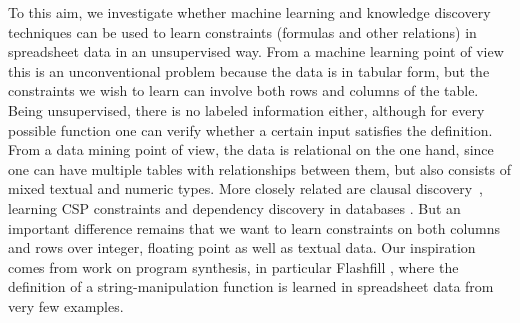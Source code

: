 To this aim,  we investigate whether machine learning and knowledge discovery techniques can be used to learn constraints (formulas and other relations) in spreadsheet data in an unsupervised way.
From a machine learning point of view this is an unconventional problem because the data is in tabular form, but the constraints we wish to learn can involve both rows and columns of the table. Being unsupervised, there is no labeled information either, although for every possible function one can verify whether a certain input satisfies the definition.
From a data mining point of view, the data is relational on the one hand, since one can have multiple tables with relationships between them, but also consists of mixed textual and numeric types. More closely related are clausal discovery~\parencite{claudien,lallouet}, learning CSP constraints \parencite{QUACQ,Conacq,modelseeker} and dependency discovery in databases \parencite{savnik}. But an important difference remains that we want to learn constraints on both columns and rows over integer, floating point as well as textual data.
Our inspiration comes from work on program synthesis, in particular Flashfill \parencite{flashfill}, where the definition of a string-manipulation function is learned in spreadsheet data from very few examples.


